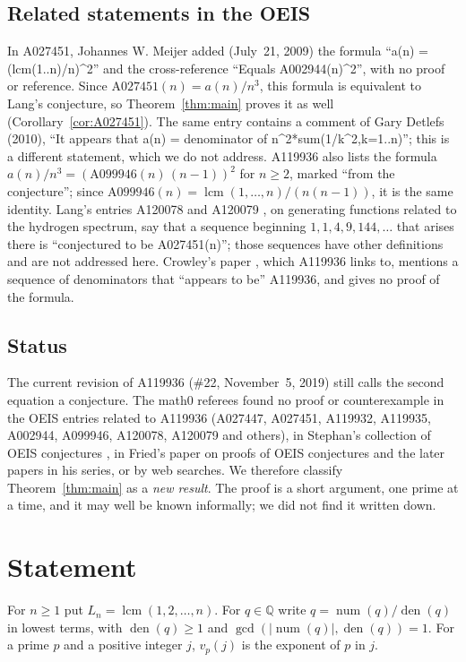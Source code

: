 \documentclass[11pt]{amsart}
\theoremstyle{plain}
\theoremstyle{definition}
\newcommand{\Q}{\mathbb{Q}}
\DeclareMathOperator{\lcm}{lcm}
\DeclareMathOperator{\den}{den}
\DeclareMathOperator{\num}{num}
\begin{document}
\subsection*{Related statements in the OEIS}
In A027451, Johannes W. Meijer added (July~21, 2009) the formula ``a(n) = (lcm(1..n)/n)\^{}2'' and the cross-reference ``Equals A002944(n)\^{}2'', with no proof or reference. Since $\mathrm{A027451}(n)=a(n)/n^3$, this formula is equivalent to Lang's conjecture, so Theorem~\ref{thm:main} proves it as well (Corollary~\ref{cor:A027451}). The same entry contains a comment of Gary Detlefs (2010), ``It appears that a(n) = denominator of n\^{}2*sum(1/k\^{}2,k=1..n)''; this is a different statement, which we do not address. A119936 also lists the formula $a(n)/n^3=(\mathrm{A099946}(n)\,(n-1))^2$ for $n\ge2$, marked ``from the conjecture''; since $\mathrm{A099946}(n)=\lcm(1,\dots,n)/(n(n-1))$, it is the same identity. Lang's entries A120078 and A120079 \cite{A120078}, on generating functions related to the hydrogen spectrum, say that a sequence beginning $1,1,4,9,144,\dots$ that arises there is ``conjectured to be A027451(n)''; those sequences have other definitions and are not addressed here. Crowley's paper \cite{Cr}, which A119936 links to, mentions a sequence of denominators that ``appears to be'' A119936, and gives no proof of the formula.

\subsection*{Status}
The current revision of A119936 (\#22, November~5, 2019) still calls the second equation a conjecture. The math0 referees found no proof or counterexample in the OEIS entries related to A119936 (A027447, A027451, A119932, A119935, A002944, A099946, A120078, A120079 and others), in Stephan's collection of OEIS conjectures \cite{St}, in Fried's paper on proofs of OEIS conjectures \cite{Fr} and the later papers in his series, or by web searches. We therefore classify Theorem~\ref{thm:main} as a \emph{new result}. The proof is a short argument, one prime at a time, and it may well be known informally; we did not find it written down.

\section{Statement}\label{sec:statement}

For $n\ge1$ put $L_n=\lcm(1,2,\dots,n)$. For $q\in\Q$ write $q=\num(q)/\den(q)$ in lowest terms, with $\den(q)\ge1$ and $\gcd(|\num(q)|,\den(q))=1$. For a prime $p$ and a positive integer $j$, $v_p(j)$ is the exponent of $p$ in $j$.
\end{document}
